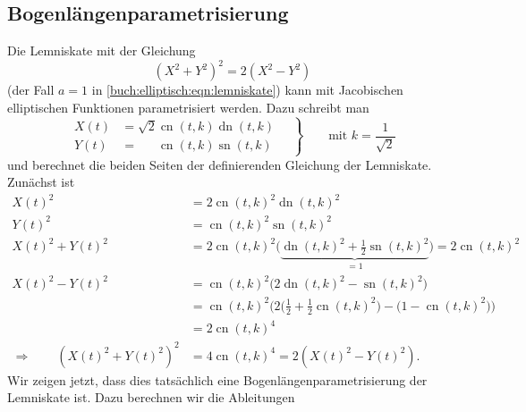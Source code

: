 \subsection{Bogenlängenparametrisierung}
Die Lemniskate mit der Gleichung
\[
(X^2+Y^2)^2=2(X^2-Y^2)
\]
(der Fall $a=1$ in \eqref{buch:elliptisch:eqn:lemniskate})
kann mit Jacobischen elliptischen Funktionen
parametrisiert werden.
Dazu schreibt man
\[
\left.
\begin{aligned}
X(t)
&=
\sqrt{2}\operatorname{cn}(t,k) \operatorname{dn}(t,k)
\\
Y(t)
&=
\phantom{\sqrt{2}}
\operatorname{cn}(t,k) \operatorname{sn}(t,k)
\end{aligned}
\quad\right\}
\qquad\text{mit $k=\displaystyle\frac{1}{\sqrt{2}}$}
\]
und berechnet die beiden Seiten der definierenden Gleichung der
Lemniskate.
Zunächst ist
\begin{align*}
X(t)^2
&=
2\operatorname{cn}(t,k)^2
\operatorname{dn}(t,k)^2
\\
Y(t)^2
&=
\operatorname{cn}(t,k)^2
\operatorname{sn}(t,k)^2
\\
X(t)^2+Y(t)^2
&=
2\operatorname{cn}(t,k)^2
\bigl(
\underbrace{
\operatorname{dn}(t,k)^2
+{\textstyle\frac12}
\operatorname{sn}(t,k)^2
}_{\displaystyle =1}
\bigr)
=
2\operatorname{cn}(t,k)^2
\\
X(t)^2-Y(t)^2
&=
\operatorname{cn}(t,k)^2
\bigl(
2\operatorname{dn}(t,k)^2 - \operatorname{sn}(t,k)^2
\bigr)
\\
&=
\operatorname{cn}(t,k)^2
\bigl(
2\bigl({\textstyle\frac12}+{\textstyle\frac12}\operatorname{cn}(t,k)^2\bigr)
-
\bigl(1-\operatorname{cn}(t,k)^2\bigr)
\bigr)
\\
&=
2\operatorname{cn}(t,k)^4
\\
\Rightarrow\qquad
(X(t)^2+Y(t)^2)^2
&=
4\operatorname{cn}(t,k)^4
=
2(X(t)^2-Y(t)^2).
\end{align*}
Wir zeigen jetzt, dass dies tatsächlich eine Bogenlängenparametrisierung
der Lemniskate ist.
Dazu berechnen wir die Ableitungen
